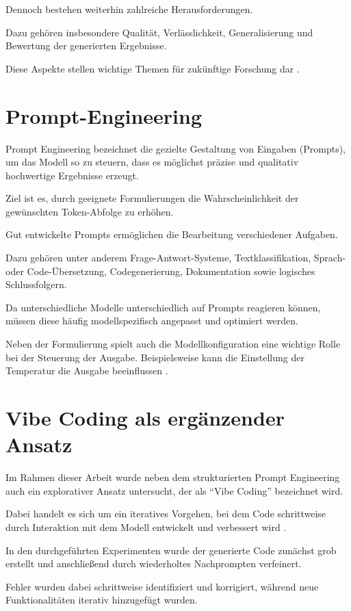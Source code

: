 Dennoch bestehen weiterhin zahlreiche
Herausforderungen.

Dazu gehören insbesondere Qualität, Verlässlichkeit,
Generalisierung und Bewertung der generierten
Ergebnisse.

Diese Aspekte stellen wichtige Themen für zukünftige
Forschung dar \cite{LLMinSEreviewandvision}.

\section{Prompt-Engineering}

Prompt Engineering bezeichnet die gezielte Gestaltung
von Eingaben (Prompts), um das Modell so zu steuern,
dass es möglichst präzise und qualitativ hochwertige
Ergebnisse erzeugt.

Ziel ist es, durch geeignete Formulierungen die
Wahrscheinlichkeit der gewünschten Token-Abfolge zu
erhöhen.

Gut entwickelte Prompts ermöglichen die Bearbeitung
verschiedener Aufgaben.

Dazu gehören unter anderem Frage-Antwort-Systeme,
Textklassifikation, Sprach- oder Code-Übersetzung,
Codegenerierung, Dokumentation sowie logisches
Schlussfolgern.

Da unterschiedliche Modelle unterschiedlich auf
Prompts reagieren können, müssen diese häufig
modellspezifisch angepasst und optimiert werden.

Neben der Formulierung spielt auch die Modellkonfiguration
eine wichtige Rolle bei der Steuerung der Ausgabe.
Beispielsweise kann die Einstellung der Temperatur
die Ausgabe beeinflussen \cite{boonstra2024prompt}.

\section{Vibe Coding als ergänzender Ansatz}

Im Rahmen dieser Arbeit wurde neben dem strukturierten
Prompt Engineering auch ein explorativer Ansatz
untersucht, der als ``Vibe Coding'' bezeichnet wird.

Dabei handelt es sich um ein iteratives Vorgehen, bei
dem Code schrittweise durch Interaktion mit dem Modell
entwickelt und verbessert wird \cite{ray2024vibecoding}.

In den durchgeführten Experimenten wurde der generierte
Code zunächst grob erstellt und anschließend durch
wiederholtes Nachprompten verfeinert.

Fehler wurden dabei schrittweise identifiziert und
korrigiert, während neue Funktionalitäten iterativ
hinzugefügt wurden.

